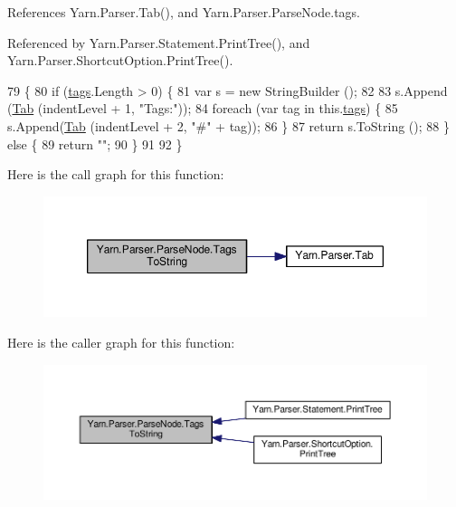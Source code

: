 References Yarn.\-Parser.\-Tab(), and Yarn.\-Parser.\-Parse\-Node.\-tags.



Referenced by Yarn.\-Parser.\-Statement.\-Print\-Tree(), and Yarn.\-Parser.\-Shortcut\-Option.\-Print\-Tree().


\begin{DoxyCode}
79             \{
80                 \textcolor{keywordflow}{if} (\hyperlink{a00142_a58b3a15788fd2d4127d73619dc6d04ae}{tags}.Length > 0) \{
81                     var s = \textcolor{keyword}{new} StringBuilder ();
82 
83                     s.Append (\hyperlink{a00143_aa8fa36b46de12a1c561d77b99c4b9ae3}{Tab} (indentLevel + 1, \textcolor{stringliteral}{"Tags:"}));
84                     \textcolor{keywordflow}{foreach} (var tag \textcolor{keywordflow}{in} this.\hyperlink{a00142_a58b3a15788fd2d4127d73619dc6d04ae}{tags}) \{
85                         s.Append(\hyperlink{a00143_aa8fa36b46de12a1c561d77b99c4b9ae3}{Tab} (indentLevel + 2, \textcolor{stringliteral}{"#"} + tag));
86                     \}
87                     \textcolor{keywordflow}{return} s.ToString ();
88                 \} \textcolor{keywordflow}{else} \{
89                     \textcolor{keywordflow}{return} \textcolor{stringliteral}{""};
90                 \}
91 
92             \}
\end{DoxyCode}


Here is the call graph for this function\-:
\nopagebreak
\begin{figure}[H]
\begin{center}
\leavevmode
\includegraphics[width=350pt]{a00142_a054f36c80d5eeacd569a8859f599af67_cgraph}
\end{center}
\end{figure}




Here is the caller graph for this function\-:
\nopagebreak
\begin{figure}[H]
\begin{center}
\leavevmode
\includegraphics[width=350pt]{a00142_a054f36c80d5eeacd569a8859f599af67_icgraph}
\end{center}
\end{figure}


